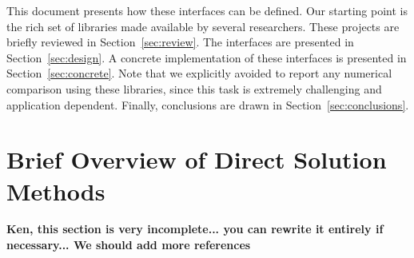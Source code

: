 \documentclass[acmtocl]{acmtrans2m}
\begin{document}
\medskip

This document presents how these interfaces can be
defined.  Our starting point is the rich set of libraries made available by
several researchers. These projects are briefly reviewed in
Section~\ref{sec:review}.  The interfaces are presented in
Section~\ref{sec:design}. A concrete implementation of these interfaces is
presented in Section~\ref{sec:concrete}.  Note that we explicitly avoided to
report any numerical comparison using these libraries, since this task
is extremely challenging and application dependent. Finally,
  conclusions are drawn in Section~\ref{sec:conclusions}. 

\section{Brief Overview of Direct Solution Methods}
\label{sec:theory}

{\bf Ken, this section is very incomplete... you can rewrite it entirely if
  necessary... We should add more references}

\bigskip
\end{document}
